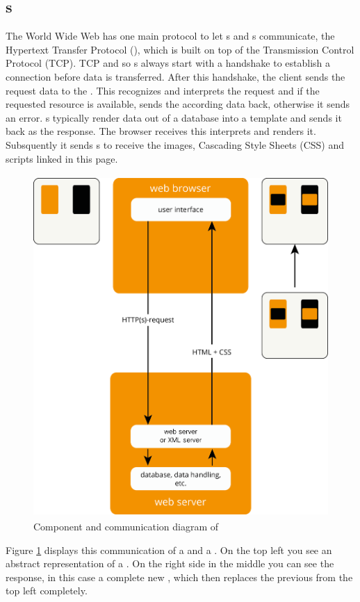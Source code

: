 \subsection{\httpRequest{}s\label{httpRequest}}
The World Wide Web has one main protocol to let \webBrowser{}s and \webServer{}s communicate, the Hypertext Transfer Protocol (\http{}), which is built on top of the Transmission Control Protocol (TCP).
TCP and so \httpRequest{}s always start with a handshake to establish a connection before data is transferred.
After this handshake, the client sends the request data to the \webServer{}.
This recognizes and interprets the request and if the requested resource is available, sends the according data back, otherwise it sends an error.
\WebApplication{}s typically render data out of a database into a \html{} template and sends it back as the response.
The browser receives this \webPage{} interprets and renders it.
Subsquently it sends \httpRequest{}s to receive the images, Cascading Style Sheets (CSS) and scripts linked in this page.
\begin{figure}[H]
\centering
\includegraphics[height=13cm]{images/http.png}
\caption[http_components]{Component and communication diagram of \http{}}
\label{fig:http_components}
\end{figure}

\noindent{}Figure \ref{fig:http_components} displays this communication of a \webBrowser{} and a \webServer{}.
On the top left you see an abstract representation of a \webPage{}.
On the right side in the middle you can see the response, in this case a complete new \webPage{}, which then replaces the previous from the top left completely.


